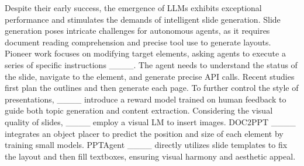 Despite their early success, the emergence of LLMs exhibits exceptional performance and stimulates the demands of intelligent slide generation.
Slide generation poses intricate challenges for autonomous agents, as it requires document reading comprehension and precise tool use to generate layouts.
Pioneer work focuses on modifying target elements, asking agents to execute a series of specific instructions ____. The agent needs to understand the status of the slide, navigate to the element, and generate precise API calls.
Recent studies first plan the outlines and then generate each page.
To further control the style of presentations, ____ introduce a reward model trained on human feedback to guide both topic generation and content extraction.
Considering the visual quality of slides, ____ employ a visual LM to insert images. 
DOC2PPT ____ integrates an object placer to predict the position and size of each element by training small models.
PPTAgent ____ directly utilizes slide templates to fix the layout and then fill textboxes, ensuring visual harmony and aesthetic appeal.